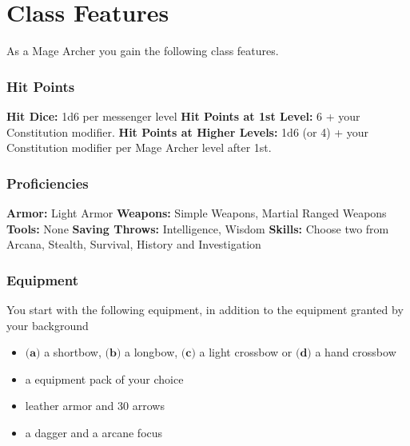 \documentclass[a4paper,10pt,twoside,twocolumn, bg=print]{dndbook} %
\begin{document}
	\section{Class Features}
		As a Mage Archer you gain the following class features.
		\subsubsection{Hit Points}
			\textbf{Hit Dice:} 1d6 per messenger level\linebreak
			\textbf{Hit Points at 1st Level:} 6 + your Constitution modifier.\linebreak
			\textbf{Hit Points at Higher Levels:} 1d6 (or 4) + your Constitution modifier per Mage Archer level after 1st.
		\subsubsection{Proficiencies}
			\textbf{Armor:} Light Armor\linebreak
			\textbf{Weapons:} Simple Weapons, Martial Ranged Weapons\linebreak
			\textbf{Tools:} None\linebreak
			\textbf{Saving Throws:} Intelligence, Wisdom\linebreak
			\textbf{Skills:} Choose two from Arcana, Stealth, Survival, History and Investigation
		\subsubsection{Equipment}
			You start with the following equipment, in addition to the equipment granted by your background\linebreak
		\begin{itemize}
			\item $\textbf{(a)}$ a shortbow, $\textbf{(b)}$ a longbow, $\textbf{(c)}$ a light crossbow or $\textbf{(d)}$ a hand crossbow
			\item a equipment pack of your choice
			\item leather armor and 30 arrows
			\item a dagger and a arcane focus
		\end{itemize}
\end{document}
